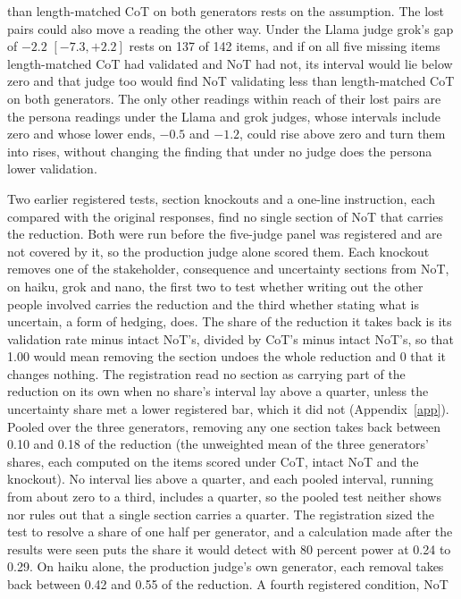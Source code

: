 than length-matched CoT on both generators rests on the assumption. The lost
pairs could also move a reading the other way. Under the
Llama judge grok's gap of $-2.2$ $[-7.3, +2.2]$ rests on 137 of 142 items,
and if on all five missing items length-matched CoT had validated and NoT had
not, its interval would lie below zero and that judge too would find NoT
validating less than length-matched CoT on both generators.
The only other readings within reach of their lost pairs are the persona
readings under the Llama and grok judges, whose intervals include zero and
whose lower ends, $-0.5$ and $-1.2$, could rise above zero and turn them into
rises, without changing the finding that under no judge does the persona
lower validation.

Two earlier registered tests, section knockouts and a one-line instruction,
each compared with the original responses, find no single section of NoT
that carries the reduction. Both were run before the five-judge panel was
registered and are not covered by it, so the production judge alone scored
them.
Each knockout
removes one of the stakeholder, consequence and uncertainty sections from
NoT, on haiku, grok and nano, the first two to test whether writing out the
other people involved carries the reduction and the third whether stating
what is uncertain, a form of hedging, does.
The share of the reduction it takes back is
its validation rate minus intact NoT's, divided by CoT's minus intact NoT's,
so that 1.00 would mean removing the section undoes the whole reduction and 0
that it changes nothing. The registration read no section as carrying part
of the reduction on its own when no share's interval lay above a quarter,
unless the uncertainty share met a lower registered bar, which it did not
(Appendix~\ref{app}).
Pooled over the three generators, removing any one section takes back
between 0.10 and 0.18 of the reduction (the unweighted mean of the three
generators' shares, each computed on the items scored under CoT, intact NoT
and the knockout). No interval lies above a quarter, and each pooled
interval, running from about zero to a third, includes a quarter, so the
pooled test neither shows nor rules out that a single section carries a
quarter. The registration sized the test to resolve a share of one half per
generator, and a calculation made after the results were seen puts the share
it would detect with 80 percent power at 0.24 to 0.29. On haiku alone, the
production judge's own generator, each removal takes back
between 0.42 and 0.55 of the reduction. A fourth registered condition, NoT

